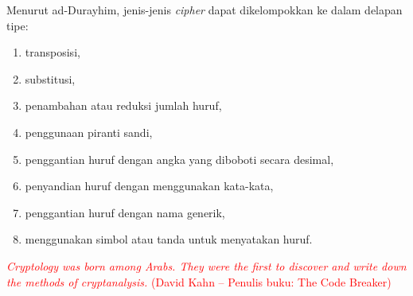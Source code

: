 \documentclass{article}
\begin{document}

Menurut ad-Durayhim, jenis-jenis \textit{cipher} dapat dikelompokkan ke dalam delapan tipe:
\begin{enumerate}
  \item transposisi,
  \item substitusi,
  \item penambahan atau reduksi jumlah huruf,
  \item penggunaan piranti sandi,
  \item penggantian huruf dengan angka yang diboboti secara desimal,
  \item penyandian huruf dengan menggunakan kata-kata,
  \item penggantian huruf dengan nama generik,
  \item menggunakan simbol atau tanda untuk menyatakan huruf.
\end{enumerate}

\vspace{10mm}

\textcolor{red}{\textit{Cryptology was born among Arabs. They were the first to discover and write down the methods of cryptanalysis.}}
\textcolor{red}{(David Kahn -- Penulis buku: The Code Breaker)}
\end{document}
